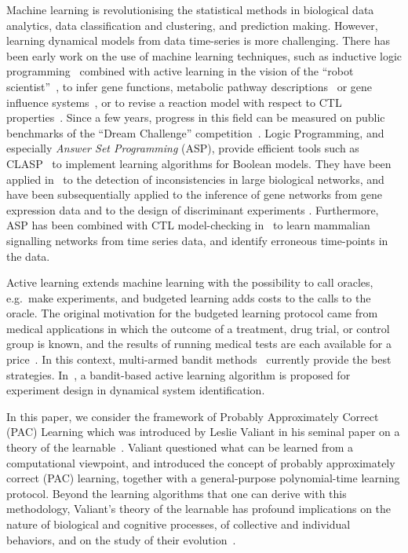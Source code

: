 \documentclass{llncs}
\begin{document}
Machine learning is revolutionising the statistical methods in biological data analytics,
data classification and clustering, and prediction making.
However, learning dynamical models from data time-series is more challenging.
There has been early work on the use of machine learning techniques, such as inductive
 logic programming~\cite{Muggleton95ngc} combined with active learning in the vision of the ``robot scientist''~\cite{BMOKRK01etai},
to infer gene functions,
metabolic pathway descriptions~\cite{AM02etai,AM02slps}
or gene influence systems~\cite{BCRG04jtb},
or to revise a reaction model with respect to CTL properties~\cite{CCFS06tcsb}.
Since a few years, progress in this field can be measured on public benchmarks
of the ``Dream Challenge'' competition~\cite{Meyer14bmc}.
Logic Programming, and especially \emph{Answer Set Programming} (ASP), provide efficient tools such as CLASP~\cite{GKNS07lpnmr}
to implement learning algorithms for Boolean models.
They have been applied in~\cite{GSTUV08iclp} to the detection of  inconsistencies in large biological networks,
and have been subsequentially applied to the inference of gene networks from gene expression data and to the design of discriminant experiments \cite{VKASSSG15frontiers}.
Furthermore, ASP has been combined with CTL model-checking in~\cite{OPSSG16biosystems} to learn mammalian signalling networks from time series data,
and identify erroneous time-points in the data.

Active learning extends machine learning with the possibility to call oracles, e.g.~make experiments,
and budgeted learning adds costs to the calls to the oracle.
The original motivation for the budgeted learning protocol came from medical applications in which the outcome of a treatment,
drug trial, or control group is known, and the results of running medical tests are each available for a price~\cite{DZBSM13ml}.
In this context, multi-armed bandit methods~\cite{DBSSZ07icdm} currently provide the best strategies.
In~\cite{LMALS14ecml}, a bandit-based active learning algorithm is proposed for experiment design in dynamical system identification.

In this paper, we consider the framework of Probably Approximately Correct (PAC) Learning 
which was introduced by Leslie Valiant in his seminal paper on a theory of the learnable~\cite{Valiant84cacm}.
Valiant questioned what can be learned from a computational viewpoint,
and introduced the concept of probably approximately correct (PAC) learning,
together with a general-purpose polynomial-time learning protocol.
Beyond the learning algorithms that one can derive with this methodology,
Valiant's theory of the learnable has profound implications
on the nature of biological and cognitive processes,
of collective and individual behaviors,
and on the study of their evolution~\cite{Valiant13book}.
\end{document}

